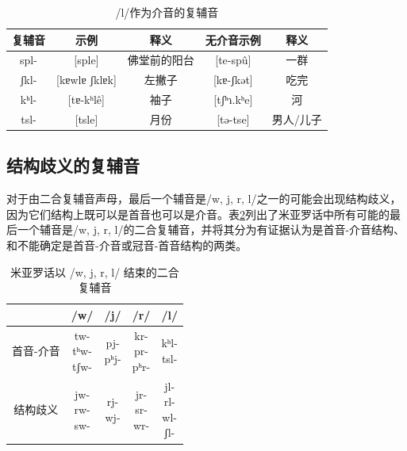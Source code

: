 \begin{table}[H]
\vspace{5pt}
    \centering
    \caption{/l/作为介音的复辅音}
    \label{lmid}
\begin{tabular}{c|cccc}
     \toprule
复辅音   & 示例              & 释义   & 无介音示例          & 释义        \\
     \midrule
	spl- & {[}sple{]}        & 佛堂前的阳台 & {[}te-spû{]}  & 一群    \\
ʃkl- & {[}kɐwlɐ ʃklɐk{]} & 左撇子    & {[}kɐ-ʃkət{]}  & 吃完    \\
kʰl- & {[}tɐ-kʰlê{]}    & 袖子     & {[}tʃʰɿ.kʰe{]} & 河     \\
tsl- & {[}tsle{]}        & 月份     & {[}tə-tse{]}   & 男人/儿子\\
   \bottomrule
\end{tabular}
\end{table}

\subsection{结构歧义的复辅音}

对于由二合复辅音声母，最后一个辅音是/w, j, r, l/之一的可能会出现结构歧义，因为它们结构上既可以是首音也可以是介音。表\ref{ambicom}列出了米亚罗话中所有可能的最后一个辅音是/w, j, r, l/的二合复辅音，并将其分为有证据认为是首音-介音结构、和不能确定是首音-介音或冠音-首音结构的两类。

\begin{table}[H]
\centering
\caption{米亚罗话以 /w, j, r, l/ 结束的二合复辅音}
\label{ambicom}
\begin{tabular}{c|cccc}
\toprule
 & /w/ & /j/ & /r/ & /l/ \\
\midrule
首音-介音
 & \makecell[l]{tw-\\ tʰw-\\ tʃw-}
 & \makecell[l]{pj-\\ pʰj-}
 & \makecell[l]{kr-\\ pr-\\ pʰr-}
 & \makecell[l]{kʰl-\\ tsl-} \\
\midrule
结构歧义
 & \makecell[l]{jw-\\ rw-\\ sw-}
 & \makecell[l]{rj-\\ wj-}
 & \makecell[l]{jr-\\ sr-\\ wr-}
 & \makecell[l]{jl-\\ rl-\\ wl-\\ ʃl-} \\
\bottomrule
\end{tabular}
\end{table}

